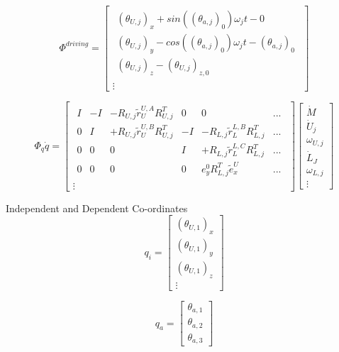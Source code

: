 \begin{equation}
    \Phi^{driving}=
    \begin{bmatrix}
    \begin{array}{l} %
    (\theta_{U,j})_x + sin((\theta_{a,j})_0)\omega_j t - 0\\
    (\theta_{U,j})_y - cos((\theta_{a,j})_0)\omega_j t - (\theta_{a,j})_0 \\
    (\theta_{U,j})_z - (\theta_{U,j})_{z,0}
    \end{array}\\
    \vdots
    \end{bmatrix}
\end{equation}

\begin{equation}
    \Phi_q \dot{q}=
    \begin{bmatrix}
    \begin{array}{cccccc} %
    I & -I & -R_{U,j}{\tilde r}^{U,A}_U R_{U,j}^T & 0 & 0 & ... \\
    0 &  I & +R_{U,j}{\tilde r}^{U,B}_U R_{U,j}^T & -I& -R_{L,j}{\tilde r}^{L,B}_L R_{L,j}^T & ...\\
    0 & 0 & 0 & I & +R_{L,j}{\tilde r}^{L,C}_L R_{L,j}^T & ... \\
    0 & 0 & 0 & 0 & e_{y}^0 R_{L,j}^T \tilde{e}_{x}^{U} & ... 
    \end{array}\\
    \vdots
    \end{bmatrix}
    \begin{bmatrix}
    \dot{M} \\
    \dot{U}_j \\
    \omega_{U,j} \\
    \dot{L}_J \\
    \omega_{L,j} \\
    \vdots
    \end{bmatrix}
\end{equation}

Independent and Dependent Co-ordinates
\begin{equation}
    q_i=
    \begin{bmatrix}
    (\theta_{U,1})_x \\
    (\theta_{U,1})_y \\
    (\theta_{U,1})_z \\
    \vdots
    \end{bmatrix}
\end{equation}

\begin{equation}
    q_a=
    \begin{bmatrix}
    \theta_{a,1} \\
    \theta_{a,2} \\
    \theta_{a,3}
    \end{bmatrix}
\end{equation}

